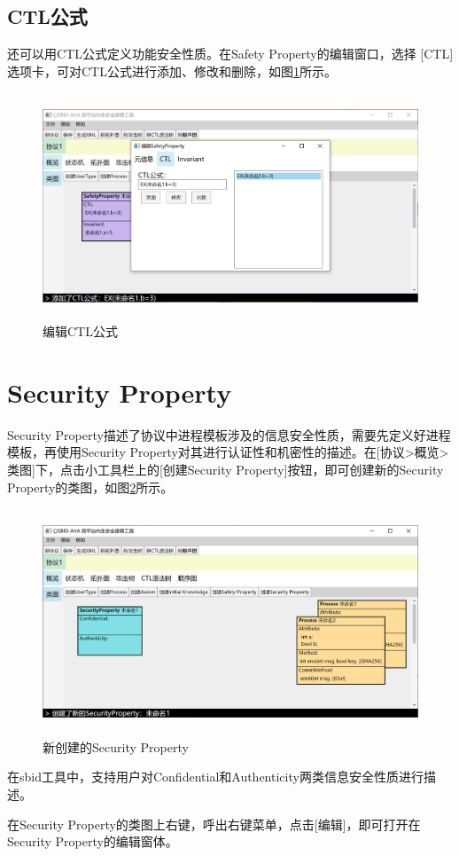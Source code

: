 \subsection{CTL公式}
\par
还可以用CTL公式定义功能安全性质。在Safety Property的编辑窗口，选择 [CTL]选项卡，可对CTL公式进行添加、修改和删除，如图\ref{safety_edit_ctl}所示。
\begin{figure}[h]
	\centering
	\includegraphics[width=12cm,height=6.75cm]{imgs/safety_edit_ctl.png}
	\caption{编辑CTL公式}
	\label{safety_edit_ctl}
\end{figure}

\section{Security Property}
Security Property描述了协议中进程模板涉及的信息安全性质，需要先定义好进程模板，再使用Security Property对其进行认证性和机密性的描述。在[协议>概览>类图]下，点击小工具栏上的[创建Security Property]按钮，即可创建新的Security Property的类图，如图\ref{create_security}所示。
\begin{figure}[h]
	\centering
	\includegraphics[width=12cm,height=6.75cm]{imgs/create_security.png}
	\caption{新创建的Security Property}
	\label{create_security}
\end{figure}
\par
在sbid工具中，支持用户对Confidential和Authenticity两类信息安全性质进行描述。
\par
在Security Property的类图上右键，呼出右键菜单，点击[编辑]，即可打开在Security Property的编辑窗体。
